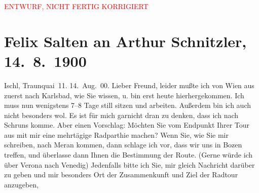 
\begin{center}
            \textcolor{red}{ENTWURF, NICHT FERTIG KORRIGIERT}
                      \end{center}
            
         
         \renewcommand{\erwaehntePersonen}{Personen: Oskar Mayer}
         \renewcommand{\erwaehnteOrte}{Orte: Ala, Bad Ischl, Bludenz, Bozen, Innsbruck, Karlsbad, Meran, Schruns, Schweiz, Traunkai, Triest, Venedig, Verona, Wien}
         \renewcommand{\erwaehnteWerke}{}
               \section[Felix Salten an Arthur Schnitzler, 14. 8. 1900]{ Felix Salten an Arthur Schnitzler, 14. 8. 1900}\nopagebreak{}\rehead{ }\begin{ledgroupsized}[t]{13cm}\normalsize\beginnumbering \toendnotes[C]{\smallbreak\pagebreak[2]} 
\toendnotes[C]{\smallbreak}\pstart
           \raggedleft{}{\pb}Ischl, Traunquai 11. \pend
           \pstart
           \raggedleft{}14. Aug. 00. \pend
           \pstart
           Lieber Freund, leider mußte ich von Wien aus zuerst nach Karlsbad, wie Sie
               wissen, u. bin erst heute hierhergekommen. Ich muss nun wenigstens 7–8 Tage still
               sitzen und arbeiten. Außerdem bin ich auch nicht besonders wol. Es ist für mich
               garnicht dran zu denken, dass ich nach Schruns
               komme. Aber einen Vorschlag: Möchten Sie vom Endpunkt Ihrer Tour aus mit mir eine
               mehrtägige Radparthie machen? Wenn Sie, wie Sie mir schreiben, nach Meran kommen, dann schlage ich vor, dass wir uns in Bozen treffen, und überlasse dann Ihnen die
               Bestimmung der Route. (Gerne {\pb}würde ich über Verona nach Venedig) Jedenfalls bitte ich Sie, mir gleich Nachricht darüber
               zu geben und mir besonders Ort der Zusammenkunft und Ziel der Radtour anzugeben,

\end{ledgroupsized}
